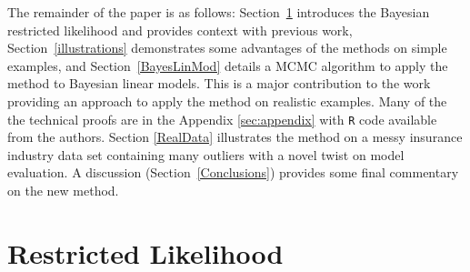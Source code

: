 \documentclass[ba]{imsart}
\newcommand{\red}[1]{{\color{red}#1}}
\newcommand{\green}[1]{{\color{green}#1}}
\begin{document}

The remainder of the paper is as follows: Section~\ref{restrictedlikelihood} introduces the Bayesian restricted likelihood and provides context with previous work, Section~\ref{illustrations} demonstrates some advantages of the methods on simple examples, and Section~\ref{BayesLinMod} details a MCMC algorithm to apply the method to Bayesian linear models. This is a major contribution to the work providing an approach to apply the method on realistic examples. Many of the the technical proofs are in the Appendix \ref{sec:appendix} with \texttt{R} code available from the authors. Section \ref{RealData} illustrates the method on a messy insurance industry data set containing many outliers with a novel twist on model evaluation. A discussion (Section~\ref{Conclusions}) provides some final commentary on the new method. 

\section{Restricted Likelihood}
\label{restrictedlikelihood}
\end{document}
